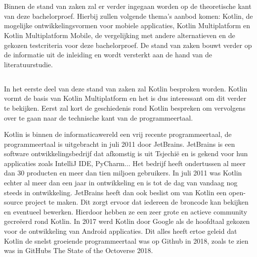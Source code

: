 \chapter{}
\label{ch:stand-van-zaken}

Binnen de stand van zaken zal er verder ingegaan worden op de theoretische kant van deze bachelorproef. Hierbij zullen volgende thema's aanbod komen: Kotlin, de mogelijke ontwikkelingsvormen voor mobiele applicaties, Kotlin Multiplatform en Kotlin Multiplatform Mobile, de vergelijking met andere alternatieven en de gekozen testcriteria voor deze bachelorproef. De stand van zaken bouwt verder op de informatie uit de inleiding en wordt versterkt aan de hand van de literatuurstudie. 


\section{}
\label{sec:SVZkotlin}

In het eerste deel van deze stand van zaken zal Kotlin besproken worden. Kotlin vormt de basis van Kotlin Multiplatform en het is dus interessant om dit verder te bekijken. Eerst zal kort de geschiedenis rond Kotlin bespreken om vervolgens over te gaan naar de technische kant van de programmeertaal.

Kotlin is binnen de informaticawereld een vrij recente programmeertaal, de programmeertaal is uitgebracht in juli 2011 door JetBrains.\autocite{Jemerov2011} JetBrains is een software ontwikkelingsbedrijf dat afkomstig is uit Tsjechië  en is gekend voor hun applicaties zoals IntelliJ IDE, PyCharm... Het bedrijf heeft ondertussen al meer dan 30 producten en meer dan tien miljoen gebruikers.\autocite{JetBrains2021} In juli 2011 was Kotlin echter al meer dan een jaar in ontwikkeling en is tot de dag van vandaag nog steeds in ontwikkeling. JetBrains heeft dan ook beslist om van Kotlin een open-source project te maken. Dit zorgt ervoor dat iedereen de broncode kan bekijken en eventueel bewerken. Hierdoor hebben ze een zeer grote en actieve community gecreëerd rond Kotlin.  In 2017 werd Kotlin door Google als de hoofdtaal gekozen voor de ontwikkeling van Android applicaties.\autocite{Shafirov2017} Dit alles heeft ertoe geleid dat Kotlin de snelst groeiende programmeertaal was op Github in 2018, zoals te zien was in GitHubs The State of the Octoverse 2018.\autocite{GitHub2018} 


